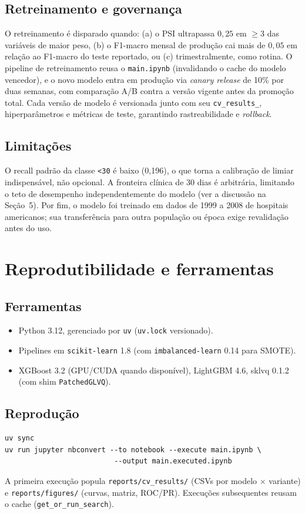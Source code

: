 \documentclass[12pt,a4paper]{article}
\begin{document}
\subsection{Retreinamento e governança}
O retreinamento é disparado quando: (a) o PSI ultrapassa $0{,}25$ em $\geq$3 das variáveis de maior peso, (b) o F1-macro mensal de produção cai mais de $0{,}05$ em relação ao F1-macro do teste reportado, ou (c) trimestralmente, como rotina. O pipeline de retreinamento reusa o \texttt{main.ipynb} (invalidando o cache do modelo vencedor), e o novo modelo entra em produção via \emph{canary release} de 10\% por duas semanas, com comparação A/B contra a versão vigente antes da promoção total. Cada versão de modelo é versionada junto com seu \texttt{cv\_results\_}, hiperparâmetros e métricas de teste, garantindo rastreabilidade e \emph{rollback}.

\subsection{Limitações}
O recall padrão da classe \texttt{<30} é baixo (0{,}196), o que torna a calibração de limiar indispensável, não opcional. A fronteira clínica de 30 dias é arbitrária, limitando o teto de desempenho independentemente do modelo (ver a discussão na Seção~5). Por fim, o modelo foi treinado em dados de 1999 a 2008 de hospitais americanos; sua transferência para outra população ou época exige revalidação antes do uso.

\section{Reprodutibilidade e ferramentas}
\subsection{Ferramentas}
\begin{itemize}
  \item Python 3.12, gerenciado por \texttt{uv} (\texttt{uv.lock} versionado).
  \item Pipelines em \texttt{scikit-learn} 1.8 (com \texttt{imbalanced-learn} 0.14 para SMOTE).
  \item XGBoost 3.2 (GPU/CUDA quando disponível), LightGBM 4.6, sklvq 0.1.2 (com shim \texttt{PatchedGLVQ}).
\end{itemize}

\subsection{Reprodução}
\begin{verbatim}
uv sync
uv run jupyter nbconvert --to notebook --execute main.ipynb \
                          --output main.executed.ipynb
\end{verbatim}
A primeira execução popula \texttt{reports/cv\_results/} (CSVs por modelo $\times$ variante) e \texttt{reports/figures/} (curvas, matriz, ROC/PR). Execuções subsequentes reusam o cache (\texttt{get\_or\_run\_search}).
\end{document}
